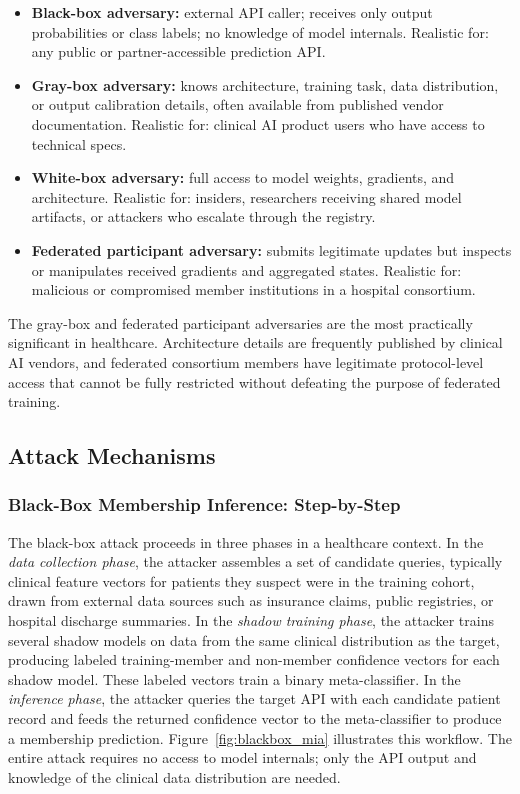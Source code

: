 \documentclass[conference]{IEEEtran}
\begin{document}
	\begin{itemize}[leftmargin=1.2em]
		\item \textbf{Black-box adversary:} external API caller; receives only output probabilities or class labels; no knowledge of model internals. Realistic for: any public or partner-accessible prediction API.
		\item \textbf{Gray-box adversary:} knows architecture, training task, data distribution, or output calibration details, often available from published vendor documentation. Realistic for: clinical AI product users who have access to technical specs.
		\item \textbf{White-box adversary:} full access to model weights, gradients, and architecture. Realistic for: insiders, researchers receiving shared model artifacts, or attackers who escalate through the registry.
		\item \textbf{Federated participant adversary:} submits legitimate updates but inspects or manipulates received gradients and aggregated states. Realistic for: malicious or compromised member institutions in a hospital consortium.
	\end{itemize}

	The gray-box and federated participant adversaries are the most practically significant in healthcare. Architecture details are frequently published by clinical AI vendors, and federated consortium members have legitimate protocol-level access that cannot be fully restricted without defeating the purpose of federated training.

	\subsection{Attack Mechanisms}

	\subsubsection{Black-Box Membership Inference: Step-by-Step}
	The black-box attack proceeds in three phases in a healthcare context. In the \emph{data collection phase}, the attacker assembles a set of candidate queries, typically clinical feature vectors for patients they suspect were in the training cohort, drawn from external data sources such as insurance claims, public registries, or hospital discharge summaries. In the \emph{shadow training phase}, the attacker trains several shadow models on data from the same clinical distribution as the target, producing labeled training-member and non-member confidence vectors for each shadow model. These labeled vectors train a binary meta-classifier. In the \emph{inference phase}, the attacker queries the target API with each candidate patient record and feeds the returned confidence vector to the meta-classifier to produce a membership prediction. Figure~\ref{fig:blackbox_mia} illustrates this workflow. The entire attack requires no access to model internals; only the API output and knowledge of the clinical data distribution are needed.
\end{document}
